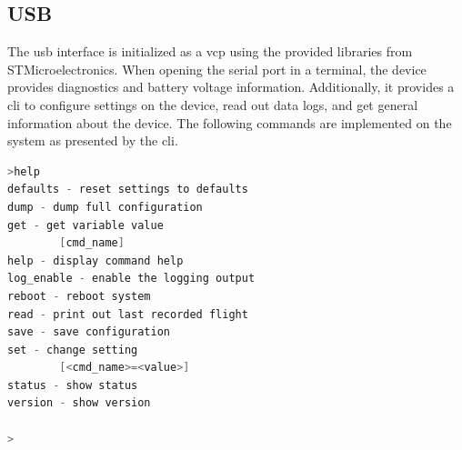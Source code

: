 \newpage

\subsection{USB}\label{usb}
The \acrshort{usb} interface is initialized as a \acrfull{vcp} using the provided libraries from STMicroelectronics. When opening the serial port in a terminal, the device provides diagnostics and battery voltage information. Additionally, it provides a \acrfull{cli} to configure settings on the device, read out data logs, and get general information about the device. The following commands are implemented on the system as presented by the \acrshort{cli}.


\bigskip
{}
\begin{lstlisting}[backgroundcolor=\color{gray!10},  
                   basicstyle=\ttfamily,
                   columns=fullflexible,
                   breakatwhitespace=false,      
                   breaklines=true,                
                   captionpos=b,                    
                   commentstyle=\color{mygreen}, 
                   extendedchars=true,              
                   frame=single,                   
                   keepspaces=true,             
                   keywordstyle=\color{blue},      
                   language=C,              
                   numbers=none,                
                   numbersep=5pt,                   
                   numberstyle=\color{blue}, 
                   rulecolor=\color{mygray},        
                   showspaces=false,
                   showstringspaces=false,
                   showtabs=false,                 
                   stepnumber=5,                  
                   stringstyle=\color{mymauve},    
                   tabsize=2,                      
                   title=\lstname,
                   frame=none,
                   xleftmargin = 1cm,
                   framexleftmargin = 1em]
>help
defaults - reset settings to defaults
dump - dump full configuration
get - get variable value
        [cmd_name]
help - display command help
log_enable - enable the logging output
reboot - reboot system
read - print out last recorded flight
save - save configuration
set - change setting
        [<cmd_name>=<value>]
status - show status
version - show version

>

\end{lstlisting}


